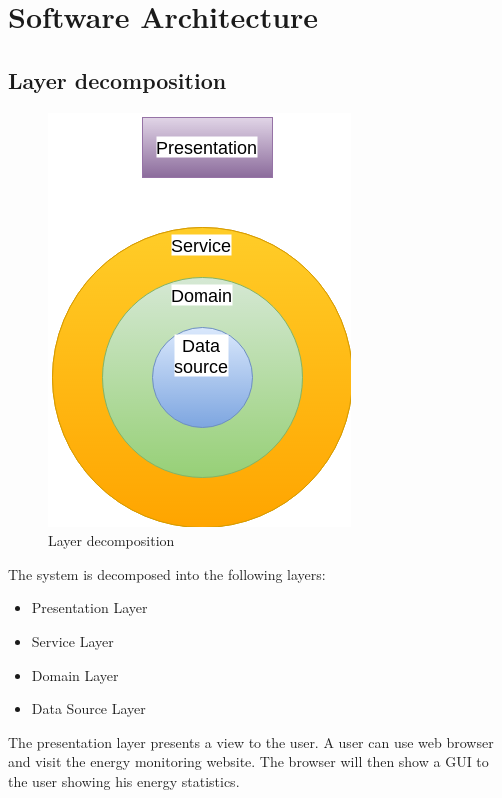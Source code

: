 \chapter{Software Architecture}
\label{ch:software}

\section{Layer decomposition}

\begin{figure}[H]
\centering
\includegraphics[scale=0.7]{7-software/images/LayersCircle.png}
\caption{Layer decomposition}
\label{fig:layerscircle}
\end{figure}

The system is decomposed into the following layers:
\begin{itemize}
\item Presentation Layer
\item Service Layer
\item Domain Layer
\item Data Source Layer
\end{itemize}

The presentation layer presents a view to the user. A user can use web browser and visit the energy monitoring website. The browser will then show a GUI to the user showing his energy statistics.\\


